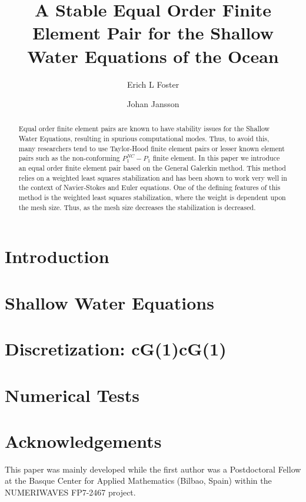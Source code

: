 \documentclass{elsarticle}
\begin{document}
  \begin{frontmatter}
    \author[1]{Erich L Foster}

    \author[1]{Johan Jansson}

    \address[1]{Basque Center for Applied Mathematics, Alameda Mazarredo, 14,
      48009 Bilbao, Basque Country -- Spain}

    \title{A Stable Equal Order Finite Element Pair for the Shallow Water
    Equations of the Ocean}

    \begin{abstract}
      Equal order finite element pairs are known to have stability issues for
      the Shallow Water Equations, resulting in spurious computational modes.
      Thus, to avoid this, many researchers tend to use Taylor-Hood finite
      element pairs or lesser known element pairs such as the non-conforming
      $P_1^{NC}-P_1$ finite element. In this paper we introduce an equal order
      finite element pair based on the General Galerkin method. This method
      relies on a weighted least squares stabilization and has been shown to
      work very well in the context of Navier-Stokes and Euler equations. One of
      the defining features of this method is the weighted least squares
      stabilization, where the weight is dependent upon the mesh size. Thus, as
      the mesh size decreases the stabilization is decreased.
    \end{abstract}
  \end{frontmatter}

  \section{Introduction} \label{sec:Intro}
  

  \section{Shallow Water Equations} \label{sec:SWE}
  

  \section{Discretization: cG(1)cG(1)} \label{sec:Discrete}
  

  \section{Numerical Tests} \label{sec:Tests}
  

  \section*{Acknowledgements}
  This paper was mainly developed while the first author was a Postdoctoral
  Fellow at the Basque Center for Applied Mathematics (Bilbao, Spain) within the
  NUMERIWAVES FP7-2467 project.

  
  
\end{document}
